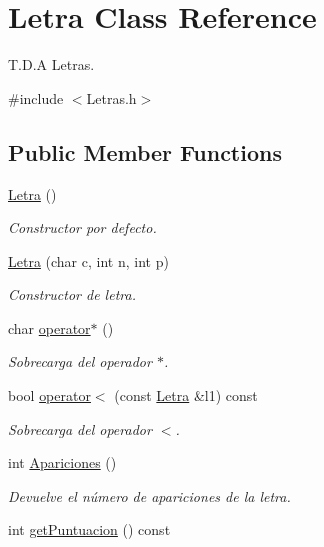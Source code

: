 \hypertarget{classLetra}{\section{Letra Class Reference}
\label{classLetra}
}


T.\-D.\-A Letras.  




{\ttfamily \#include $<$Letras.\-h$>$}

\subsection*{Public Member Functions}
\begin{DoxyCompactItemize}
\item 
\hypertarget{classLetra_a2e236c67e3630258c6d3d9f2a9e66709}{\hyperlink{classLetra_a2e236c67e3630258c6d3d9f2a9e66709}{Letra} ()}\label{classLetra_a2e236c67e3630258c6d3d9f2a9e66709}

\begin{DoxyCompactList}\small\item\em Constructor por defecto. \end{DoxyCompactList}\item 
\hyperlink{classLetra_a804a0cf4500ade0de00fabafd9584d6a}{Letra} (char c, int n, int p)
\begin{DoxyCompactList}\small\item\em Constructor de letra. \end{DoxyCompactList}\item 
char \hyperlink{classLetra_a1ad25981967c28b953d7d91de35d885c}{operator$\ast$} ()
\begin{DoxyCompactList}\small\item\em Sobrecarga del operador $\ast$. \end{DoxyCompactList}\item 
bool \hyperlink{classLetra_ae0f6f243352d8c30b737f1d79d709b2b}{operator$<$} (const \hyperlink{classLetra}{Letra} \&l1) const 
\begin{DoxyCompactList}\small\item\em Sobrecarga del operador $<$. \end{DoxyCompactList}\item 
\hypertarget{classLetra_aef45374aff34ec187e033d5c7acd0936}{int \hyperlink{classLetra_aef45374aff34ec187e033d5c7acd0936}{Apariciones} ()}\label{classLetra_aef45374aff34ec187e033d5c7acd0936}

\begin{DoxyCompactList}\small\item\em Devuelve el número de apariciones de la letra. \end{DoxyCompactList}\item 
\hypertarget{classLetra_a4927d7cefb4b0f2320673b4707780972}{int \hyperlink{classLetra_a4927d7cefb4b0f2320673b4707780972}{get\-Puntuacion} () const }\label{classLetra_a4927d7cefb4b0f2320673b4707780972}


\end{DoxyCompactItemize}
